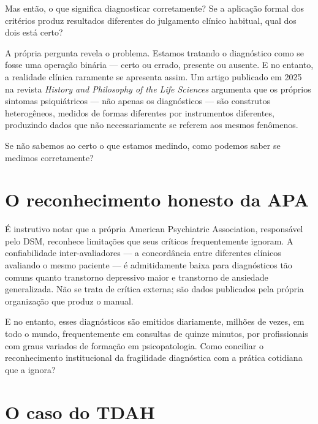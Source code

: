 Mas então, o que significa diagnosticar corretamente? Se a aplicação formal dos critérios produz resultados diferentes do julgamento clínico habitual, qual dos dois está certo?

A própria pergunta revela o problema. Estamos tratando o diagnóstico como se fosse uma operação binária --- certo ou errado, presente ou ausente. E no entanto, a realidade clínica raramente se apresenta assim. Um artigo publicado em 2025 na revista \textit{History and Philosophy of the Life Sciences} argumenta que os próprios sintomas psiquiátricos --- não apenas os diagnósticos --- são construtos heterogêneos, medidos de formas diferentes por instrumentos diferentes, produzindo dados que não necessariamente se referem aos mesmos fenômenos.

Se não sabemos ao certo o que estamos medindo, como podemos saber se medimos corretamente?

\section{O reconhecimento honesto da APA}
\label{sec:reconhecimento-apa}

É instrutivo notar que a própria American Psychiatric Association, responsável pelo DSM, reconhece limitações que seus críticos frequentemente ignoram. A confiabilidade inter-avaliadores --- a concordância entre diferentes clínicos avaliando o mesmo paciente --- é admitidamente baixa para diagnósticos tão comuns quanto transtorno depressivo maior e transtorno de ansiedade generalizada. Não se trata de crítica externa; são dados publicados pela própria organização que produz o manual.

E no entanto, esses diagnósticos são emitidos diariamente, milhões de vezes, em todo o mundo, frequentemente em consultas de quinze minutos, por profissionais com graus variados de formação em psicopatologia. Como conciliar o reconhecimento institucional da fragilidade diagnóstica com a prática cotidiana que a ignora?

\section{O caso do TDAH}
\label{sec:caso-tdah}

